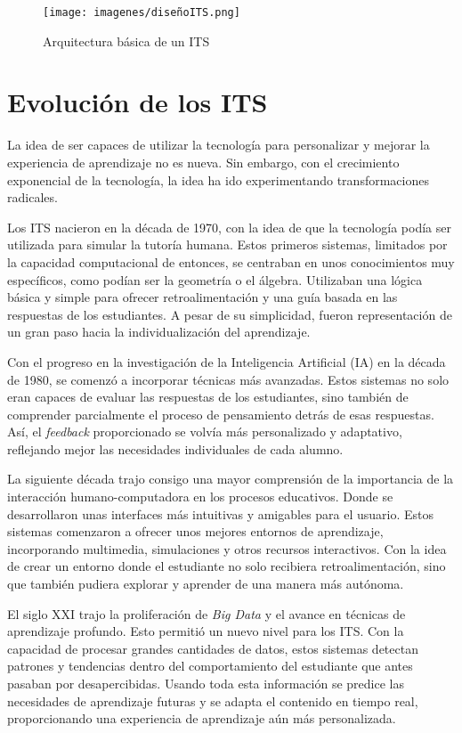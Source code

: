 \begin{figure}[H]
    \centering
    \texttt{[image: imagenes/diseñoITS.png]}
    \caption{Arquitectura básica de un ITS \cite{Butz2006}}
    \label{fig:arqITS}
\end{figure}

\section{Evolución de los ITS}

La idea de ser capaces de utilizar la tecnología para personalizar y mejorar la experiencia de aprendizaje no es nueva. Sin embargo, con el crecimiento exponencial de la tecnología, la idea ha ido experimentando transformaciones radicales.

Los ITS nacieron en la década de 1970, con la idea de que la tecnología podía ser utilizada para simular la tutoría humana. Estos primeros sistemas, limitados por la capacidad computacional de entonces, se centraban en unos conocimientos muy específicos, como podían ser la geometría o el álgebra. Utilizaban una lógica básica y simple para ofrecer retroalimentación y una guía basada en las respuestas de los estudiantes. A pesar de su simplicidad, fueron representación de un gran paso hacia la individualización del aprendizaje.

Con el progreso en la investigación de la Inteligencia Artificial (IA) en la década de 1980, se comenzó a incorporar técnicas más avanzadas. Estos sistemas no solo eran capaces de evaluar las respuestas de los estudiantes, sino también de comprender parcialmente el proceso de pensamiento detrás de esas respuestas. Así, el \textit{feedback} proporcionado se volvía más personalizado y adaptativo, reflejando mejor las necesidades individuales de cada alumno.

La siguiente década trajo consigo una mayor comprensión de la importancia de la interacción humano-computadora en los procesos educativos. Donde se desarrollaron unas interfaces más intuitivas y amigables para el usuario. Estos sistemas comenzaron a ofrecer unos mejores entornos de aprendizaje, incorporando multimedia, simulaciones y otros recursos interactivos. Con la idea de crear un entorno donde el estudiante no solo recibiera retroalimentación, sino que también pudiera explorar y aprender de una manera más autónoma.

El siglo XXI trajo la proliferación de \textit{Big Data} y el avance en técnicas de aprendizaje profundo. Esto permitió un nuevo nivel para los ITS. Con la capacidad de procesar grandes cantidades de datos, estos sistemas detectan patrones y tendencias dentro del comportamiento del estudiante que antes pasaban por desapercibidas. Usando toda esta información se predice las necesidades de aprendizaje futuras y se adapta el contenido en tiempo real, proporcionando una experiencia de aprendizaje aún más personalizada.

